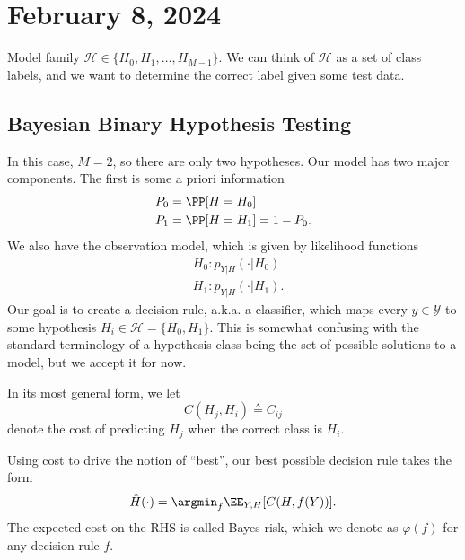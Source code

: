 \section{February 8, 2024}

Model family $\mathcal{H}\in \{H_0, H_1, \hdots, H_{M-1}\}$. We can think of $\mathcal{H}$ as a set of class labels, and we want to determine the correct label given some test data.

\subsection{Bayesian Binary Hypothesis Testing}

In this case, $M=2$, so there are only two hypotheses. Our model has two major components. The first is some a priori information 
\begin{align*}
	P_0 &= \PP[H=H_0] \\
	P_1 &= \PP[H=H_1] = 1 - P_0.
\end{align*}
We also have the observation model, which is given by likelihood functions
\begin{align*}
	&H_0: p_{Y|H}(\cdot | H_0) \\
	&H_1: p_{Y|H}(\cdot | H_1).
\end{align*}
Our goal is to create a \ac{decision rule}, a.k.a. a \ac{classifier}, which maps every $y\in \mathcal{Y}$ to some hypothesis $H_i\in \mathcal{H}=\{H_0, H_1\}$. This is somewhat confusing with the standard terminology of a hypothesis class being the set of possible solutions to a model, but we accept it for now.

\begin{definition}

In its most general form, we let
\[C(H_j, H_i)\triangleq C_{ij}\]
denote the cost of predicting $H_j$ when the correct class is $H_i$. 
\end{definition}

Using cost to drive the notion of ``best'', our best possible decision rule takes the form 
\[\hat{H}(\cdot) = \argmin_{f}\EE_{Y,H}[C(H,f(Y))].\] 
The expected cost on the RHS is called \ac{Bayes risk}, which we denote as $\varphi(f)$ for any decision rule $f$.

